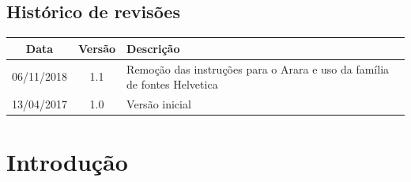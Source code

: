 \documentclass[11pt]{report}
\begin{document}
\clearpage

\section*{Histórico de revisões}
\noindent
      \begin{tabular}{|c|c|p{12cm}|} \hline
         \textbf{Data} & \textbf{Versão} & \textbf{Descrição} \\ \hline \hline
         06/11/2018 & 1.1 & Remoção das instruções para o Arara e uso da família de fontes Helvetica \\ \hline
         13/04/2017 & 1.0 & Versão inicial \\ \hline
      \end{tabular}

\clearpage


\tableofcontents
\printglossaries
\clearpage
\pagestyle{fancyplain}




\chapter{Introdução}
\label{cap:introducao}



%
%
%
\end{document}
